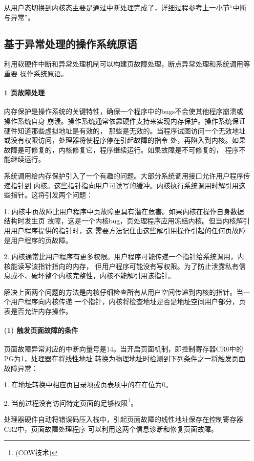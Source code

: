 \documentclass[12pt,openany,a4paper]{report}
\begin{document}
	    从用户态切换到内核态主要是通过中断处理完成了，详细过程参考上一小节“中断与异常”。\par
	\subsection{基于异常处理的操作系统原语}
	    利用软硬件中断和异常处理机制可以构建页故障处理，断点异常处理和系统调用等重要
	操作系统原语。\par
	\paragraph{1 页故障处理}
	    
	    内存保护是操作系统的关键特性，确保一个程序中的bugs不会使其他程序崩溃或操作系统自身
	崩溃。操作系统通常依靠硬件支持来实现内存保护。操作系统保证硬件知道那些虚拟地址是有效的，
	那些是无效的。当程序试图访问一个无效地址或没有权限访问，处理器将使程序停在引起故障的指令
	处，再陷入到内核。如果故障是可修复的，内核修复它，程序继续运行。如果故障是不可修复的，
	程序不能继续运行。\par
	    系统调用给内存保护引入了一个有趣的问题。大部分系统调用接口允许用户程序传递指针到
	内核。这些指针指向用户可读写的缓冲。内核执行系统调用时解引用这些指针。这将引发两个问题：\par
	
	    1. 内核中页故障比用户程序中页故障更具有潜在危害。如果内核在操作自身数据结构时发生页
	故障，这是一个内核bug，页处理程序应用冻结内核。但当内核解引用用户程序提供的指针时，这
	需要方法记住由这些解引用操作引起的任何页故障是用户程序的页故障。\par
	    2. 内核通常比用户程序有更多权限。用户程序可能传递一个指针给系统调用，内核能读写该指针指向的内存，
	但用户程序可能没有写权限。为了防止泄露私有信息或不、破坏整个内核完整性，内核不能解引用该指针。\par
	    解决上面两个问题的方法是内核仔细检查所有从用户空间传递到内核的指针。当一个用户程序向内核传递
	一个指针，内核将检查地址是否是地址空间用户部分，页表是否允许内存操作。\par
	
	\paragraph{(1) 触发页面故障的条件}
	    页面故障异常对应的中断向量号是14。当开启页面机制，即控制寄存器CR0中的PG为1，处理器在将线性地址
	转换为物理地址时检测到下列条件之一将触发页面故障异常：\par
	    1. 在地址转换中相应页目录项或页表项中的存在位为0。\par
	    2. 当前过程没有访问特定页面的足够权限\footnote{(COW技术)}。  \par
	    处理器硬件自动将错误码压入栈中，引起页面故障的线性地址保存在控制寄存器CR2中，页面故障处理程序
	可以利用这两个信息诊断和修复页面故障。\par
\end{document}
